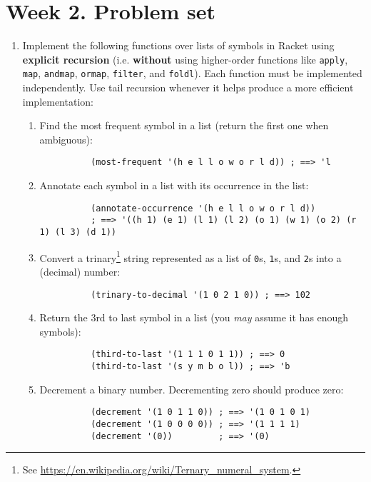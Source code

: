 \documentclass[dvipsnames]{article}
\newcommand{\racket}[1]{\texttt{#1}}
\begin{document}
\;
\vspace{0.5cm}

\section*{Week 2. Problem set}

\thispagestyle{fancy}

\begin{enumerate}
  \item Implement the following functions over lists of symbols in Racket using \textbf{explicit recursion} (i.e. \textbf{without} using higher-order functions like \racket{apply}, \racket{map}, \racket{andmap}, \racket{ormap}, \racket{filter}, and \racket{foldl}).
  Each function must be implemented independently.
  Use tail recursion whenever it helps produce a more efficient implementation:
    \begin{enumerate}
      \item Find the most frequent symbol in a list (return the first one when ambiguous):
        \begin{verbatim}
          (most-frequent '(h e l l o w o r l d)) ; ==> 'l
        \end{verbatim}
      \item Annotate each symbol in a list with its occurrence in the list:
        \begin{verbatim}
          (annotate-occurrence '(h e l l o w o r l d))
          ; ==> '((h 1) (e 1) (l 1) (l 2) (o 1) (w 1) (o 2) (r 1) (l 3) (d 1))
        \end{verbatim}
        \item Convert a trinary\footnote{See \url{https://en.wikipedia.org/wiki/Ternary_numeral_system}.} string represented as a list of \racket{0}s, \racket{1}s, and \racket{2}s into a (decimal) number:
        \begin{verbatim}
          (trinary-to-decimal '(1 0 2 1 0)) ; ==> 102
        \end{verbatim}
      \item Return the 3rd to last symbol in a list (you \emph{may} assume it has enough symbols):
        \begin{verbatim}
          (third-to-last '(1 1 1 0 1 1)) ; ==> 0
          (third-to-last '(s y m b o l)) ; ==> 'b
        \end{verbatim}
      \item Decrement a binary number. Decrementing zero should produce zero:
        \begin{verbatim}
          (decrement '(1 0 1 1 0)) ; ==> '(1 0 1 0 1)
          (decrement '(1 0 0 0 0)) ; ==> '(1 1 1 1)
          (decrement '(0))         ; ==> '(0)
        \end{verbatim}
    \end{enumerate}


\end{enumerate}
\end{document}
